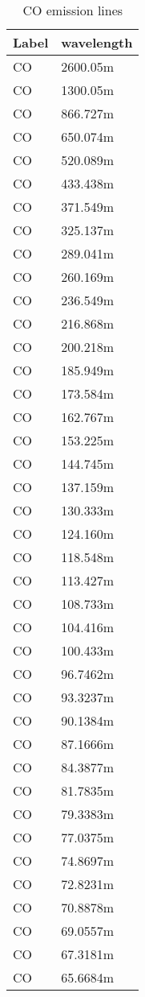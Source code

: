 \begin{table}
\centering
\caption{\label{tab:COLines}CO emission lines}
\begin{tabular}{ll}
\hline
Label & wavelength \\
\hline
CO      & 2600.05m \\
CO      & 1300.05m \\
CO      & 866.727m \\
CO  	& 650.074m \\
CO  	& 520.089m \\
CO  	& 433.438m \\
CO  	& 371.549m \\
CO  	& 325.137m \\
CO  	& 289.041m \\
CO  	& 260.169m \\
CO  	& 236.549m \\
CO  	& 216.868m \\
CO  	& 200.218m \\
CO  	& 185.949m \\
CO  	& 173.584m \\
CO  	& 162.767m \\
CO  	& 153.225m \\
CO  	& 144.745m \\
CO  	& 137.159m \\
CO  	& 130.333m \\
CO  	& 124.160m \\
CO  	& 118.548m \\
CO  	& 113.427m \\
CO  	& 108.733m \\
CO  	& 104.416m \\
CO  	& 100.433m \\
CO  	& 96.7462m \\
CO  	& 93.3237m \\
CO  	& 90.1384m \\
CO  	& 87.1666m \\
CO  	& 84.3877m \\
CO  	& 81.7835m \\
CO  	& 79.3383m \\
CO  	& 77.0375m \\
CO  	& 74.8697m \\
CO  	& 72.8231m \\
CO  	& 70.8878m \\
CO  	& 69.0557m \\
CO  	& 67.3181m \\
CO  	& 65.6684m \\
\hline
\end{tabular}
\end{table}

